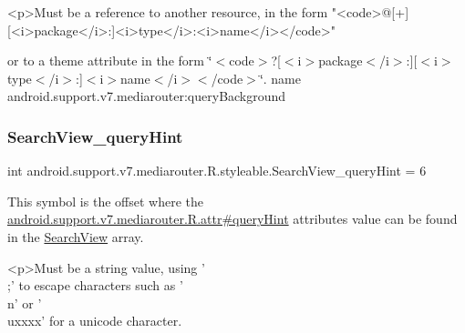\begin{DoxyVerb}      <p>Must be a reference to another resource, in the form "<code>@[+][<i>package</i>:]<i>type</i>:<i>name</i></code>"
\end{DoxyVerb}
 or to a theme attribute in the form \char`\"{}$<$code$>$?\mbox{[}$<$i$>$package$<$/i$>$\+:\mbox{]}\mbox{[}$<$i$>$type$<$/i$>$\+:\mbox{]}$<$i$>$name$<$/i$>$$<$/code$>$\char`\"{}.  name android.\+support.\+v7.\+mediarouter\+:query\+Background \mbox{\label{classandroid_1_1support_1_1v7_1_1mediarouter_1_1R_1_1styleable_a8a63f4bf8bd850c17ab2faf9d9eb2305}} 
\subsubsection{\texorpdfstring{Search\+View\+\_\+query\+Hint}{SearchView\_queryHint}}
{\footnotesize\ttfamily int android.\+support.\+v7.\+mediarouter.\+R.\+styleable.\+Search\+View\+\_\+query\+Hint = 6\hspace{0.3cm}{\ttfamily [static]}}

This symbol is the offset where the \hyperlink{classandroid_1_1support_1_1v7_1_1mediarouter_1_1R_1_1attr_abeee02032ebb8d80eca5e69bb2f3e84b}{android.\+support.\+v7.\+mediarouter.\+R.\+attr\#query\+Hint} attribute\textquotesingle{}s value can be found in the \hyperlink{classandroid_1_1support_1_1v7_1_1mediarouter_1_1R_1_1styleable_a5573e3195bf93122a37c69394418c7d7}{Search\+View} array.

\begin{DoxyVerb}      <p>Must be a string value, using '\\;' to escape characters such as '\\n' or '\\uxxxx' for a unicode character.
\end{DoxyVerb}
 

